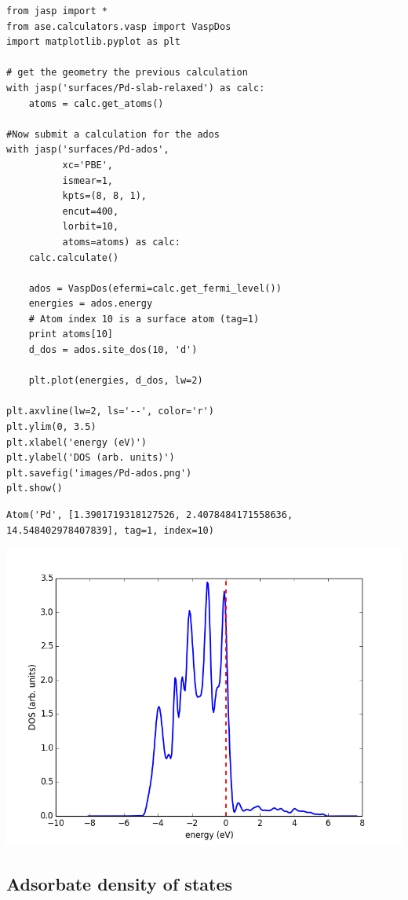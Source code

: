 \documentclass[11pt]{article}
\begin{document}
\begin{verbatim}
from jasp import *
from ase.calculators.vasp import VaspDos
import matplotlib.pyplot as plt

# get the geometry the previous calculation
with jasp('surfaces/Pd-slab-relaxed') as calc:
    atoms = calc.get_atoms()

#Now submit a calculation for the ados
with jasp('surfaces/Pd-ados',
          xc='PBE',
          ismear=1,
          kpts=(8, 8, 1),
          encut=400,
          lorbit=10,
          atoms=atoms) as calc:
    calc.calculate()

    ados = VaspDos(efermi=calc.get_fermi_level())
    energies = ados.energy
    # Atom index 10 is a surface atom (tag=1)
    print atoms[10]
    d_dos = ados.site_dos(10, 'd')

    plt.plot(energies, d_dos, lw=2)

plt.axvline(lw=2, ls='--', color='r')
plt.ylim(0, 3.5)
plt.xlabel('energy (eV)')
plt.ylabel('DOS (arb. units)')
plt.savefig('images/Pd-ados.png')
plt.show()
\end{verbatim}

\begin{verbatim}
Atom('Pd', [1.3901719318127526, 2.4078484171558636, 14.548402978407839], tag=1, index=10)
\end{verbatim}

\includegraphics[width=.9\linewidth]{./images/Pd-ados.png}




\subsection{Adsorbate density of states}
\label{sec-4-3}
\end{document}
